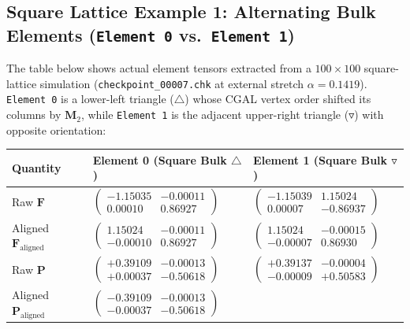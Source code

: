 \documentclass[11pt,a4paper]{article}
\newcommand{\code}[1]{\texttt{#1}}
\begin{document}
\subsection{Square Lattice Example 1: Alternating Bulk Elements (\code{Element 0} vs.\ \code{Element 1})}
The table below shows actual element tensors extracted from a $100 \times 100$ square-lattice simulation (\code{checkpoint\_00007.chk} at external stretch $\alpha = 0.1419$). \code{Element 0} is a lower-left triangle ($\triangle$) whose CGAL vertex order shifted its columns by $\mathbf{M}_2$, while \code{Element 1} is the adjacent upper-right triangle ($\triangledown$) with opposite orientation:

\begin{center}
\renewcommand{\arraystretch}{1.35}
\small
\begin{tabular}{@{}lll@{}}
\toprule
\textbf{Quantity} & \textbf{Element 0 (Square Bulk $\triangle$)} & \textbf{Element 1 (Square Bulk $\triangledown$)} \\
\midrule
Raw $\mathbf{F}$ &
$\begin{pmatrix} -1.15035 & -0.00011 \\ 0.00010 & 0.86927 \end{pmatrix}$ &
$\begin{pmatrix} -1.15039 & 1.15024 \\ 0.00007 & -0.86937 \end{pmatrix}$ \\[10pt]
Aligned $\mathbf{F}_{\text{aligned}}$ &
$\begin{pmatrix} 1.15024 & -0.00011 \\ -0.00010 & 0.86927 \end{pmatrix}$ &
$\begin{pmatrix} 1.15024 & -0.00015 \\ -0.00007 & 0.86930 \end{pmatrix}$ \\[10pt]
Raw $\mathbf{P}$ &
$\begin{pmatrix} +0.39109 & -0.00013 \\ +0.00037 & -0.50618 \end{pmatrix}$ &
$\begin{pmatrix} +0.39137 & -0.00004 \\ -0.00009 & \mathbf{+0.50583} \end{pmatrix}$ \\[10pt]
Aligned $\mathbf{P}_{\text{aligned}}$ &
$\begin{pmatrix} -0.39109 & -0.00013 \\ -0.00037 & \mathbf{-0.50618} \end{pmatrix}$ &

\end{tabular}
\end{center}
\end{document}
